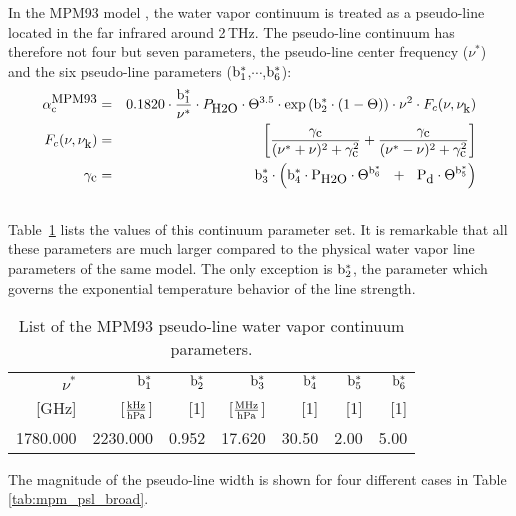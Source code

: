{
\label{leveld:mpm93:contabs}
In the MPM93 model \citep{liebeetal:93}, the water 
vapor continuum is treated as a pseudo-line located in the far infrared 
around 2\,THz. The pseudo-line continuum has therefore not four but seven 
parameters, the pseudo-line center frequency ($\nu^*$) and the six 
pseudo-line parameters ($\rm b^*_{\rm 1}$,$\cdots$,$\rm b^*_{\rm 6}$):
%
\begin{eqnarray}
  \label{eq:mpm93:contabs}
  \alphampmnc & = & 0.1820 \cdot \frac{\beks}{\nu^*} \cdot \phzo \cdot 
                \Theta^{3.5} \cdot \exp{\left(\bzks\cdot(1-\Theta)\right)} \cdot 
                \nu^2 \cdot \shapec\\
%
  \label{eq:mpm93:contabs1}
   \shapec & = & \left[\frac{\gamc}{(\nu^*+\nu)^2+\gamc^2} + 
                       \frac{\gamc}{(\nu^*-\nu)^2+\gamc^2}\right]\\
%
  \label{eq:mpm93:contabs2}
  \gamc & = &  \bdks \cdot 
        \left(\bvks \cdot \phzo \cdot \Theta^{\bsks}~~+~~ 
                          \pda  \cdot \Theta^{\bfks}\right)\\
  \nonumber
\end{eqnarray}
%
Table~\ref{tab:mpm93_cont_param} lists the values of this continuum 
parameter set. It is remarkable that all these parameters are much 
larger compared to the physical water vapor line parameters of the 
same model. The only exception is $\rm b^*_{\rm 2}$, the parameter 
which governs the exponential temperature behavior of the line strength. 
%
\begin{table}[!hbt]
  \begin{center}
  \begin{tabular}{rrrrrrr}
   \hline
   $\nu^*$ & $\rm b^*_{\rm 1}$ & $\rm b^*_{\rm 2}$ & $\rm b^*_{\rm 3}$ & $\rm b^*_{\rm 4}$ & $\rm b^*_{\rm 5}$ & $\rm b^*_{\rm 6}$\\
   {\rm [GHz]}  & {[$\frac{\rm kHz}{\rm hPa}$]} & {\rm [1]} & 
   {[$\frac{\rm MHz}{\rm hPa}$]} & {\rm [1]} & {\rm [1]} & {\rm [1]} \\
    \hline
   1780.000 & 2230.000 & 0.952 & 17.620 & 30.50 & 2.00 & 5.00 \\
   \hline
  \end{tabular}
  \end{center}
  \caption{List of the MPM93 pseudo-line water vapor continuum parameters.}
  \label{tab:mpm93_cont_param}
\end{table}
%
The magnitude of the pseudo-line width is shown for four different 
cases in Table\,\ref{tab:mpm_psl_broad}. 
%
\begin{table}[!htb]

\end{table}}
